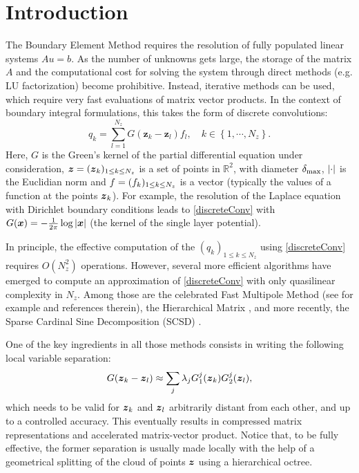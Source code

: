 \documentclass[smallextended]{svjour3}
\begin{document}
\section*{Introduction}
The Boundary Element Method requires the resolution of fully populated linear systems $Au = b$. As the number of unknowns gets large, the storage of the matrix $A$ and the computational cost for solving the system through direct methods (e.g. LU factorization) become prohibitive. Instead, iterative methods can be used, which require very fast evaluations of matrix vector products. In the context of boundary integral formulations, this takes the form of discrete convolutions:
\begin{equation}
	q_k = \sum_{l=1}^{N_z} G(\boldsymbol{z}_k - \boldsymbol{z}_l) f_l, \quad k \in \left\{1, \cdots, N_z\right\}.
	\label{discreteConv}					
\end{equation}
Here, $G$ is the Green's kernel of the partial differential equation under consideration, $\boldsymbol{z} = (\boldsymbol{z}_{k})_{1 \leq k \leq N_z}$  is a set of points in $\mathbb{R}^2$, with diameter $\delta_{\max}$, $\left\lvert \cdot \right\rvert$ is the Euclidian norm and $f = (f_{k})_{1 \leq k \leq N_z}$ is a vector (typically the values of a function at the points $\boldsymbol{z}_k$). For example, the resolution of the Laplace equation with Dirichlet boundary conditions leads to \eqref{discreteConv} with $G(\boldsymbol{x}) = -\frac{1}{2\pi}\log \left\lvert \boldsymbol{x} \right\rvert$ (the kernel of the single layer potential). 

In principle, the effective computation of the $(q_k)_{1 \leq k\leq N_z}$ using \eqref{discreteConv} requires $O(N_z^2)$ operations. However, several more efficient algorithms have emerged to compute an approximation of \eqref{discreteConv} with only quasilinear complexity in $N_z$. Among those are the celebrated Fast Multipole Method (see for example \cite{greengard1988rapid,rokhlin1990rapid, rokhlin1993diagonal, coifman1993fast, cheng1999fast} and references therein), the Hierarchical Matrix \cite{borm2003introduction}, and more recently, the Sparse Cardinal Sine Decomposition (SCSD) \cite{Alouges2015}.

One of the key ingredients in all those methods consists in writing the following local variable separation:
\[G(\boldsymbol{z}_k- \boldsymbol{z}_l) \approx \sum_j \lambda_j G^j_1(\boldsymbol{z}_k)G^j_2(\boldsymbol{z}_l),\] 
which needs to be valid for $\boldsymbol{z}_k$ and $\boldsymbol{z}_l$ arbitrarily distant from each other, and up to a controlled accuracy. This eventually results in compressed matrix representations and accelerated matrix-vector product. Notice that, to be fully effective, the former separation is usually made locally with the help of a geometrical splitting of the cloud of points $\boldsymbol{z}$ using a hierarchical octree.
\end{document}
